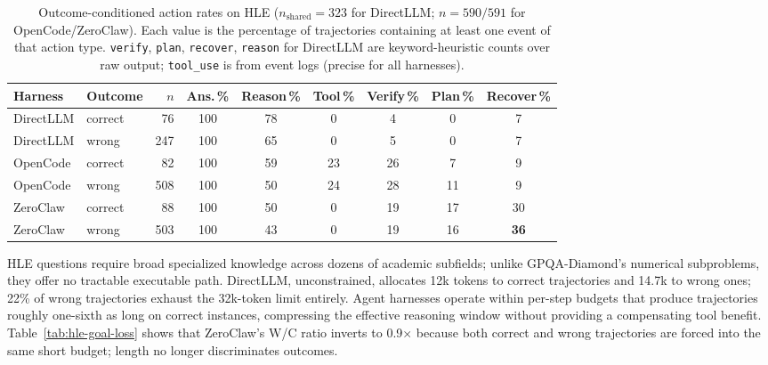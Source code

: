 \begin{table}[t]
\centering
\small
\caption{%
  Outcome-conditioned action rates on HLE ($n_{\text{shared}}=323$ for
  DirectLLM; $n=590/591$ for OpenCode/ZeroClaw).
  Each value is the percentage of trajectories containing at least one event
  of that action type.
  \texttt{verify}, \texttt{plan}, \texttt{recover}, \texttt{reason} for
  DirectLLM are keyword-heuristic counts over raw output; \texttt{tool\_use}
  is from event logs (precise for all harnesses).
}
\label{tab:hle-action-rates}
\setlength{\tabcolsep}{4pt}
\begin{tabular}{llrcccccc}
\toprule
Harness & Outcome & $n$ & Ans.\,\% & Reason\,\% & Tool\,\% & Verify\,\% & Plan\,\% & Recover\,\% \\
\midrule
DirectLLM & correct &  76 & 100 & 78 &  0 &  4 &  0 &  7 \\
DirectLLM & wrong   & 247 & 100 & 65 &  0 &  5 &  0 &  7 \\
\midrule
OpenCode  & correct &  82 & 100 & 59 & 23 & 26 &  7 &  9 \\
OpenCode  & wrong   & 508 & 100 & 50 & 24 & 28 & 11 &  9 \\
\midrule
ZeroClaw  & correct &  88 & 100 & 50 &  0 & 19 & 17 & 30 \\
ZeroClaw  & wrong   & 503 & 100 & 43 &  0 & 19 & 16 & \textbf{36} \\
\bottomrule
\end{tabular}
\end{table}


HLE questions require broad specialized knowledge across dozens of academic
subfields; unlike GPQA-Diamond's numerical subproblems, they offer no
tractable executable path.
DirectLLM, unconstrained, allocates 12k tokens to correct trajectories and
14.7k to wrong ones; 22\% of wrong trajectories exhaust the 32k-token limit
entirely.
Agent harnesses operate within per-step budgets that produce trajectories
roughly one-sixth as long on correct instances, compressing the effective
reasoning window without providing a compensating tool benefit.
Table~\ref{tab:hle-goal-loss} shows that ZeroClaw's W/C ratio inverts to
0.9$\times$ because both correct and wrong trajectories are forced into the
same short budget; length no longer discriminates outcomes.

